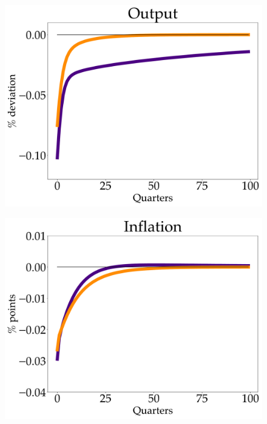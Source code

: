 \begin{figure}[htb]
\begin{minipage}{0.33\textwidth}
  \includegraphics[scale=.14]{text/chapter1/Figures/Y_IPR}
  \label{fig:3}
\end{minipage}
\begin{minipage}{0.33\textwidth}
  \includegraphics[scale=.14]{text/chapter1/Figures/pi_IPR}
  \label{fig:4}
\end{minipage}
\medskip
\begin{minipage}{0.33\textwidth}

\end{minipage}
\end{figure}
